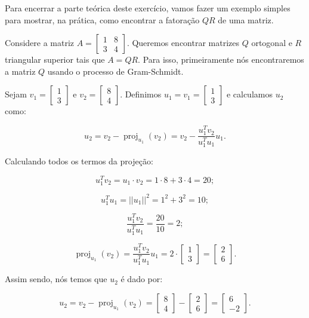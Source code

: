 Para encerrar a parte teórica deste exercício, vamos fazer um exemplo simples para mostrar, na prática, como encontrar a fatoração $QR$ de uma matriz.

\begin{Example}
	Considere a matriz $A = \begin{bmatrix}
		1 & 8 \\
		3 & 4
	\end{bmatrix}$. Queremos encontrar matrizes $Q$ ortogonal e $R$ triangular superior tais que $A = QR$. Para isso, primeiramente nós encontraremos a matriz $Q$ usando o processo de Gram-Schmidt.
	
	Sejam $v_1 = \begin{bmatrix}
		1 \\
		3
	\end{bmatrix}$ e $v_2 = \begin{bmatrix}
		8 \\
		4
	\end{bmatrix}$. Definimos $u_1 = v_1 = \begin{bmatrix}
		1 \\
		3
	\end{bmatrix}$ e calculamos $u_2$ como:
	
	$$
	u_2 = v_2 - \operatorname{proj}_{u_1}(v_2) = v_2 - \dfrac{u_1^Tv_2}{u_1^Tu_1}u_1.
	$$
	
	Calculando todos os termos da projeção:
	
	$$
	u_1^Tv_2 = u_1\cdot v_2 = 1\cdot 8 + 3\cdot 4 = 20;
	$$
	
	$$
	u_1^Tu_1 = ||u_1||^2 = 1^2 + 3^2 = 10;
	$$
	
	$$
	\dfrac{u_1^Tv_2}{u_1^Tu_1} = \dfrac{20}{10} = 2;
	$$
	
	$$
	\operatorname{proj}_{u_1}(v_2) = \dfrac{u_1^Tv_2}{u_1^Tu_1}u_1 = 2\cdot\begin{bmatrix}
		1 \\
		3
	\end{bmatrix} = \begin{bmatrix}
		2 \\
		6
	\end{bmatrix}.
	$$
	
	Assim sendo, nós temos que $u_2$ é dado por:
	
	$$
	u_2 = v_2 - \operatorname{proj}_{u_1}(v_2) = \begin{bmatrix}
		8 \\
		4
	\end{bmatrix} - \begin{bmatrix}
		2 \\
		6
	\end{bmatrix} = \begin{bmatrix}
		6 \\
		-2
	\end{bmatrix}.
	$$
	

\end{Example}
